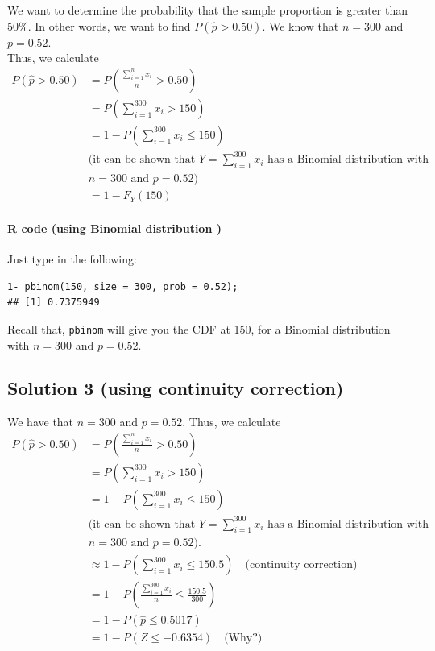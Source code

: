 \begin{example}
We want to determine the probability that the sample proportion is greater than 50\%. In other words, we want to find $P(\hat{p} > 0.50)$. We know that 
$n = 300$ and $p = 0.52$. \\
Thus, we calculate
\begin{align*}
P(\hat{p} > 0.50) &= P\left(\frac{\sum_{i=1}^{n} x_i}{n} > 0.50\right) \\
&= P\left(\sum_{i=1}^{300} x_i > 150\right) \\
&= 1 - P\left(\sum_{i=1}^{300} x_i \leq 150\right) \\
&\text{(it can be shown that } Y = \sum_{i=1}^{300} x_i \text{ has a Binomial distribution with} \\
&n = 300 \text{ and } p = 0.52\text{)} \\
&= 1 - F_Y(150)
\end{align*}

\paragraph*{R code (using Binomial distribution )}

Just type in the following:

\begin{verbatim}
1- pbinom(150, size = 300, prob = 0.52);
## [1] 0.7375949
\end{verbatim}

Recall that, \texttt{pbinom} will give you the CDF at 150, for a Binomial distribution with $n = 300$ and $p = 0.52$.

\subsection*{Solution 3 (using continuity correction)}


We have that $n = 300$ and $p = 0.52$.
Thus, we calculate
\begin{align*}
P(\hat{p} > 0.50) &= P\left( \frac{\sum_{i=1}^{n} x_i}{n} > 0.50 \right) \\
&= P\left( \sum_{i=1}^{300} x_i > 150 \right) \\
&= 1 - P\left( \sum_{i=1}^{300} x_i \leq 150 \right) \\
&\text{(it can be shown that } Y = \sum_{i=1}^{300} x_i \text{ has a Binomial distribution with} \\
&n = 300 \text{ and } p = 0.52\text{)}. \\
&\approx 1 - P\left( \sum_{i=1}^{300} x_i \leq 150.5 \right) \quad \text{(continuity correction)} \\
&= 1 - P\left( \frac{\sum_{i=1}^{300} x_i}{n} \leq \frac{150.5}{300} \right) \\
&= 1 - P(\hat{p} \leq 0.5017) \\
&= 1 - P\left( Z \leq -0.6354 \right) \quad \text{(Why?)}
\end{align*}

\end{example}
